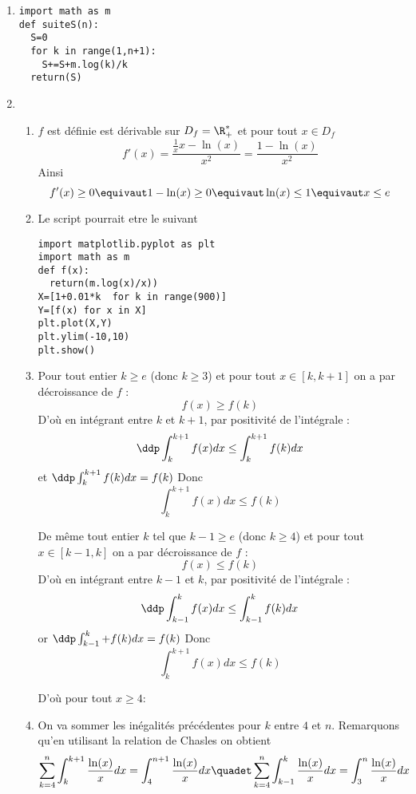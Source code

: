 \documentclass[a4paper, 11pt,reqno]{article}
\begin{document}
\begin{correction}
\begin{enumerate}
\item 
\begin{lstlisting}
import math as m
def suiteS(n):
  S=0
  for k in range(1,n+1):
    S+=S+m.log(k)/k
  return(S)
\end{lstlisting}

\item 
\begin{enumerate}
\item $f$ est définie est dérivable sur $D_f=\R_+^*$ et pour tout $x\in D_f$
$$f'(x)= \frac{\frac{1}{x} x -\ln(x)}{x^2} = \frac{1-\ln(x)}{x^2}$$
Ainsi $$f'(x) \geq 0 \equivaut 1-\ln(x)\geq 0 \equivaut \ln(x)\leq 1 \equivaut x\leq e$$
\begin{center}
\end{center}
\item
Le script  pourrait etre le suivant 
 \begin{lstlisting}
import matplotlib.pyplot as plt
import math as m
def f(x):
  return(m.log(x)/x))
X=[1+0.01*k  for k in range(900)]
Y=[f(x) for x in X]
plt.plot(X,Y)
plt.ylim(-10,10)
plt.show()
\end{lstlisting}
\item Pour tout entier $k\geq e $ (donc $k\geq 3$) et pour tout $x\in [k,k+1]$ on a par décroissance de $f$ : 
$$f(x) \geq f(k)$$
D'où en intégrant entre $k $ et $k+1$, par positivité de l'intégrale :
$$\ddp \int_{k}^{k+1} f(x) dx\leq \int_{k}^{k+1} f(k) dx$$
et $\ddp \int_{k}^{k+1} f(k) dx= f(k)$ Donc 
$$\int_{k}^{k+1} f(x) dx\leq f(k) $$

De même  tout entier $k$ tel que $k-1\geq e $ (donc $k\geq 4$) et pour tout $x\in [k-1,k ]$ on a par décroissance de $f$ : 
$$f(x) \leq f(k)$$
D'où en intégrant entre $k-1 $ et $k$, par positivité de l'intégrale :
$$\ddp \int_{k-1}^{k} f(x) dx\leq \int_{k-1}^{k} f(k) dx$$
or $\ddp \int_{k-1}^{k}+ f(k) dx= f(k)$ Donc 
$$\int_{k}^{k+1} f(x) dx\leq f(k) $$

D'où pour tout $x\geq 4$:

\item 
On va sommer les inégalités précédentes pour $k$ entre $4$ et $n$. 
Remarquons qu'en utilisant la relation de Chasles on obtient 
$$\sum_{k=4}^n \int_k^{k+1} \frac{\ln(x)}{x}dx = \int_4^{n+1} \frac{\ln(x)}{x} dx \quadet \sum_{k=4}^n \int_{k-1}^{k} \frac{\ln(x)}{x}dx = \int_3^{n} \frac{\ln(x)}{x} dx$$ 


\end{enumerate}
\end{enumerate}
\end{correction}
\end{document}
